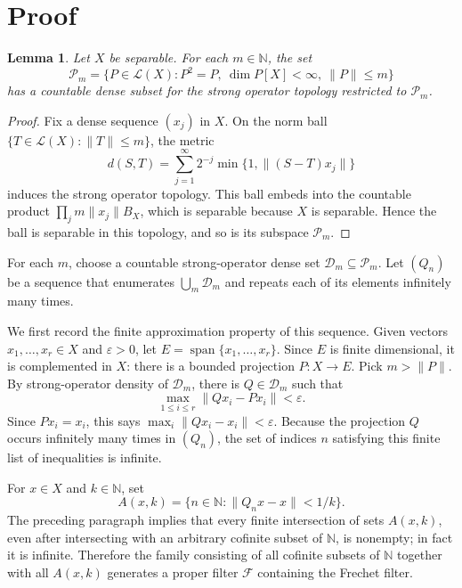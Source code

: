 \documentclass[11pt]{article}
\newtheorem{lemma}{Lemma}
\newcommand{\N}{\mathbb N}
\begin{document}
\section*{Proof}

\begin{lemma}
Let \(X\) be separable.  For each \(m\in\N\), the set
\[
\mathcal P_m=\{P\in \mathcal L(X): P^2=P,\ \dim P[X]<\infty,\ \|P\|\le m\}
\]
has a countable dense subset for the strong operator topology restricted to
\(\mathcal P_m\).
\end{lemma}

\begin{proof}
Fix a dense sequence \((x_j)\) in \(X\).  On the norm ball
\(\{T\in\mathcal L(X):\|T\|\le m\}\), the metric
\[
d(S,T)=\sum_{j=1}^\infty 2^{-j}\min\{1,\|(S-T)x_j\|\}
\]
induces the strong operator topology.  This ball embeds into the countable
product \(\prod_j m\|x_j\|B_X\), which is separable because \(X\) is separable.
Hence the ball is separable in this topology, and so is its subspace
\(\mathcal P_m\).
\end{proof}

For each \(m\), choose a countable strong-operator dense set
\(\mathcal D_m\subseteq\mathcal P_m\).  Let \((Q_n)\) be a sequence that
enumerates \(\bigcup_m\mathcal D_m\) and repeats each of its elements
infinitely many times.

We first record the finite approximation property of this sequence.  Given
vectors \(x_1,\ldots,x_r\in X\) and \(\varepsilon>0\), let
\(E=\operatorname{span}\{x_1,\ldots,x_r\}\).  Since \(E\) is finite
dimensional, it is complemented in \(X\): there is a bounded projection
\(P:X\to E\).  Pick \(m>\|P\|\).  By strong-operator density of
\(\mathcal D_m\), there is \(Q\in\mathcal D_m\) such that
\[
\max_{1\le i\le r}\|Qx_i-Px_i\|<\varepsilon.
\]
Since \(Px_i=x_i\), this says \(\max_i\|Qx_i-x_i\|<\varepsilon\).  Because
the projection \(Q\) occurs infinitely many times in \((Q_n)\), the set of
indices \(n\) satisfying this finite list of inequalities is infinite.

For \(x\in X\) and \(k\in\N\), set
\[
A(x,k)=\{n\in\N:\|Q_nx-x\|<1/k\}.
\]
The preceding paragraph implies that every finite intersection of sets
\(A(x,k)\), even after intersecting with an arbitrary cofinite subset of
\(\N\), is nonempty; in fact it is infinite.  Therefore the family consisting
of all cofinite subsets of \(\N\) together with all \(A(x,k)\) generates a
proper filter \(\mathcal F\) containing the Frechet filter.
\end{document}
